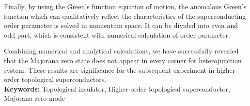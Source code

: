 Finally, by using the Green's function equation of motion, the anomalous Green's function which can qualitatively reflect the characteristics of the superconducting order parameter is solved in momentum space. It can be divided into even and odd part, which is consistent with numerical calculation of order parameter. 

Combining numerical and analytical calculations, we have successfully revealed that the Majorana zero state does not appear in every corner for  heterojunction system. These results are significance for the subsequent experiment in higher-order topological superconductors.
 \\
\noindent\textbf{ Keywords:} Topological insulator, Higher-order topological superconductor, Majorana zero mode